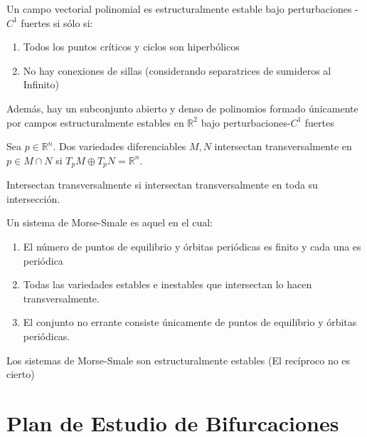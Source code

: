 \begin{thm}
	Un campo vectorial polinomial es estructuralmente estable bajo perturbaciones -$C^1$ fuertes si sólo si:
	
	\begin{enumerate}
		\item Todos los puntos críticos y ciclos son hiperbólicos 
		
		\item No hay conexiones de sillas (considerando separatrices de sumideros al Infinito)
	\end{enumerate}
	
	Además, hay un subconjunto abierto y denso de polinomios formado únicamente por campos estructuralmente estables en $\mathbb{R}^2$ bajo perturbaciones-$C^1$ fuertes 
\end{thm}

\begin{defn}
	Sea $p\in \mathbb{R}^n$. Dos variedades diferenciables $M,N$  intersectan transversalmente en $p\in M\cap N$ si $T_pM\oplus T_pN = \mathbb{R}^n$.
	
	Intersectan transversalmente si intersectan transversalmente en toda su intersección.
\end{defn}

\begin{defn}
	Un sistema de Morse-Smale es aquel en el cual:
	
	\begin{enumerate}
		\item El número de puntos de equilibrio y órbitas periódicas es finito y cada una es periódica
		
		\item Todas las variedades estables e inestables que intersectan lo hacen transversalmente.
		
		\item El conjunto no errante consiste únicamente de puntos de equilibrio y órbitas periódicas.
	\end{enumerate}
\end{defn}

\begin{thm}
	Los sistemas de Morse-Smale son estructuralmente estables (El recíproco no es cierto)
\end{thm}

\section{Plan de Estudio de Bifurcaciones}

